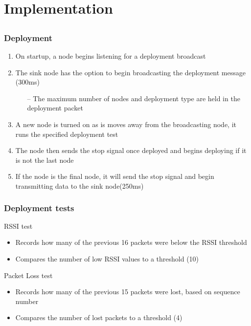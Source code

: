 \section{Implementation}
\subsection*{}

\begin{frame}[t]
  \frametitle{Deployment}

  \begin{enumerate}
  \item On startup, a node begins listening for a deployment broadcast
  \item The sink node has the option to begin broadcasting the deployment message (300ms)
    \begin{itemize}
    \item[--] The maximum number of nodes and deployment type are held in the deployment packet
    \end{itemize}
  \item A new node is turned on as is moves away from the broadcasting node, it runs the specified deployment test
  \item The node then sends the stop signal once deployed and begins deploying if it is not the last node
  \item If the node is the final node, it will send the stop signal and begin transmitting data to the sink node(250ms)
    
  \end{enumerate}
  
\end{frame}

\begin{frame}[t]
  \frametitle{Deployment tests}

  RSSI test
  \begin{itemize}
  \item Records how many of the previous 16 packets were below the RSSI threshold
  \item Compares the number of low RSSI values to a threshold (10)
  \end{itemize}

  \vfill

  Packet Loss test
  \begin{itemize}
  \item Records how many of the previous 15 packets were lost, based on sequence number
  \item Compares the number of lost packets to a threshold (4)
  \end{itemize}
\end{frame}


